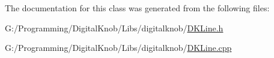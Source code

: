 The documentation for this class was generated from the following files\-:\begin{DoxyCompactItemize}
\item 
G\-:/\-Programming/\-Digital\-Knob/\-Libs/digitalknob/\hyperlink{_d_k_line_8h}{D\-K\-Line.\-h}\item 
G\-:/\-Programming/\-Digital\-Knob/\-Libs/digitalknob/\hyperlink{_d_k_line_8cpp}{D\-K\-Line.\-cpp}\end{DoxyCompactItemize}
